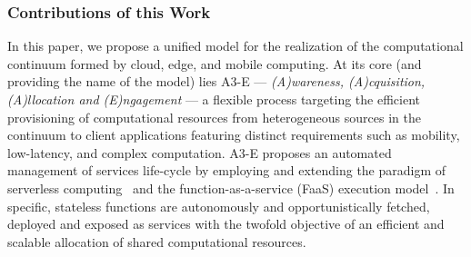 
%


\subsubsection*{Contributions of this Work}


In this paper, we propose a unified model for the realization of the computational continuum formed by cloud, edge, and mobile computing. At its core (and providing the name of the model) lies A3-E --- \textit{(A)wareness, (A)cquisition, (A)llocation and (E)ngagement} --- a flexible process targeting the efficient provisioning of computational resources from heterogeneous sources in the continuum to client applications featuring distinct requirements such as mobility, low-latency, and complex computation. 
A3-E proposes an automated management of services life-cycle by employing and extending the paradigm of serverless computing~\cite{Hendrickson:2016,baldini2017serverless,GarrigaMendonca2017} and the function-as-a-service (FaaS) execution model~\cite{MateosFaaster17}. In specific, stateless functions are autonomously and opportunistically fetched, deployed and exposed as services with the twofold objective of an efficient and scalable allocation of shared computational resources. 

